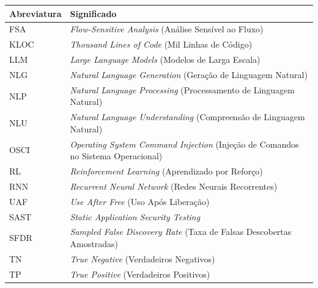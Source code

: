 \documentclass[
    12pt,                %
    openright,           %
    oneside,             %
    a4paper,             %
    english,             %
    brazil               %
]{abntex2}
\begin{document}
\begin{center}
\begin{tabular}{@{}p{3.2cm}p{}@{}}
\toprule
\textbf{Abreviatura} & \textbf{Significado} \\
\midrule
FSA  & \textit{Flow-Sensitive Analysis} (Análise Sensível ao Fluxo) \\
KLOC & \textit{Thousand Lines of Code} (Mil Linhas de Código) \\
LLM  & \textit{Large Language Models} (Modelos de Larga Escala) \\
NLG  & \textit{Natural Language Generation} (Geração de Linguagem Natural) \\
NLP  & \textit{Natural Language Processing} (Processamento de Linguagem Natural) \\
NLU  & \textit{Natural Language Understanding} (Compreensão de Linguagem Natural) \\
OSCI & \textit{Operating System Command Injection} (Injeção de Comandos no Sistema Operacional) \\
RL   & \textit{Reinforcement Learning} (Aprendizado por Reforço) \\
RNN  & \textit{Recurrent Neural Network} (Redes Neurais Recorrentes) \\
UAF  & \textit{Use After Free} (Uso Após Liberação) \\
SAST & \textit{Static Application Security Testing} \\
SFDR & \textit{Sampled False Discovery Rate} (Taxa de Falsas Descobertas Amostradas) \\
TN   & \textit{True Negative} (Verdadeiros Negativos) \\
TP   & \textit{True Positive} (Verdadeiros Positivos) \\
\bottomrule
\end{tabular}
\end{center}

\cleardoublepage

\tableofcontents*
\cleardoublepage

\textual

\end{document}
